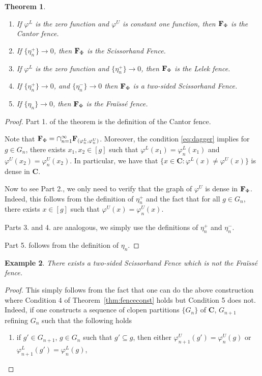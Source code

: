 \documentclass[11pt]{amsart}
\newtheorem{theorem}{Theorem}[section]
\newtheorem{example}[theorem]{Example}
\newcommand{\cantor}{\mathbf C}
\newcommand{\fence}{{\bf F}_{\Phi}{}}
\begin{document}
{\begin{theorem}
    \begin{enumerate}
    \item If $\varphi^L$ is the zero function and $\varphi^U$ is constant one function, then $\fence$ is the Cantor fence.
    \item  If $\{\eta^+_n\}  \rightarrow 0$, then $\fence$ is the Scissorhand Fence.
    \item If $\varphi^L$ is the zero function and $\{\eta^+_n\} \rightarrow 0$, then $\fence$ is the Lelek fence.
    \item If $\{\eta^+_n\} \rightarrow 0$, and $\{\eta^-_n\} \rightarrow 0$ then $\fence$ is a two-sided Scissorhand Fence.
        \item If $\{\eta_n\} \rightarrow 0$, then $\fence$ is the Fra\"iss\'e fence.

    
    \end{enumerate}
    
\end{theorem}

\begin{proof}
Part 1. of the theorem is the definition of the Cantor fence.

Note that $\fence = \cap _{n=1}^{\infty} {\bf F}_{(\varphi^L_n, \varphi^U_n)}$.
Moreover, the condition \eqref{eq:dagger} implies for $ g\in G_n$, there exists $x_1, x_2 \in [g]$ such that $\varphi^L(x_1) = \varphi_n^L(x_1)$ and $\varphi^U(x_2) = \varphi_n^U(x_2)$. In particular, we have that $\{x \in \cantor: \varphi^L(x) \neq \varphi^U (x) \} $ is dense in $\cantor$.

Now to see Part 2., we only need to verify that the graph of $\varphi^U$ is dense in $\fence$. Indeed, this follows from the definition of $\eta^+_n$ and the fact that for all $g \in G_n$, there exists $x \in [g]$ such that $\varphi^U(x) = \varphi_n^U(x)$.


Parts 3.  and 4. are analogous, we simply use the definitions of $\eta^+_n$ and $\eta^-_n$.

Part 5. follows from the definition of $\eta_n$.
\end{proof}

\begin{example}\label{ex:bifusednotfraisse}
    There exists a two-sided Scissorhand Fence which is not the Fra\"iss\'e fence.
   \end{example} 
\begin{proof}
    This simply follows from the fact that one can do the above construction where Condition 4 of Theorem~\ref{thm:fenceconst} holds but Condition 5 does not. Indeed, if one constructs a sequence of clopen partitions $\{G_n\}$ of $\cantor$,  $G_{n+1}$ refining $G_n$ such that  
the following holds 
\begin{enumerate}[label=(\alph*)]
 \item if $g' \in G_{n+1}$, $g \in G_n$ such that $g' \subseteq g$, then either $\varphi^U_{n+1} (g') = \varphi^U_{n} (g) $ or $\varphi^L_{n+1} (g') = \varphi^L_{n} (g) $,
  

\end{enumerate}
\end{proof}}
\end{document}
